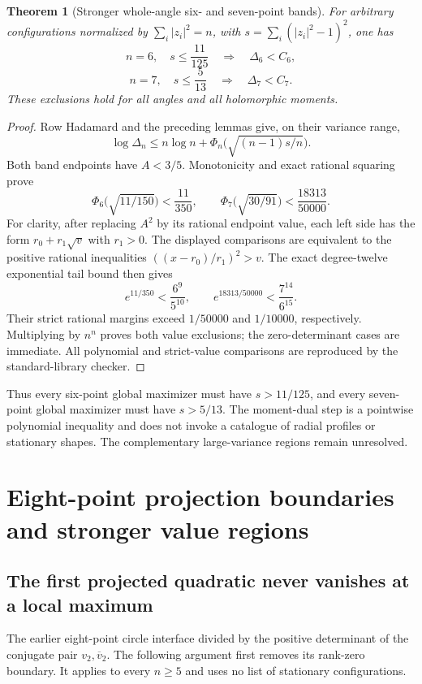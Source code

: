 \documentclass[11pt]{article}
\newtheorem{theorem}{Theorem}[section]
\theoremstyle{remark}
\numberwithin{equation}{section}
\begin{document}
\begin{theorem}[Stronger whole-angle six- and seven-point bands]
\label{thm:noorigin-oct8-quintic-bands}
For arbitrary configurations normalized by $\sum_i|z_i|^2=n$,
with $s=\sum_i(|z_i|^2-1)^2$, one has
\[
 n=6,\quad s\le\frac{11}{125}\quad\Longrightarrow\quad\Delta_6<C_6,
\]
\[
 n=7,\quad s\le\frac5{13}\quad\Longrightarrow\quad\Delta_7<C_7.
\]
These exclusions hold for all angles and all holomorphic moments.
\end{theorem}
\begin{proof}
Row Hadamard and the preceding lemmas give, on their variance range,
\[
       \log\Delta_n\le n\log n+\Phi_n\bigl(\sqrt{(n-1)s/n}\bigr).
\]
Both band endpoints have $A<3/5$. Monotonicity and exact rational
squaring prove
\[
 \Phi_6\bigl(\sqrt{11/150}\bigr)<\frac{11}{350},\qquad
 \Phi_7\bigl(\sqrt{30/91}\bigr)<\frac{18313}{50000}.
\]
For clarity, after replacing $A^2$ by its rational endpoint value,
each left side has the form $r_0+r_1\sqrt v$ with $r_1>0$.
The displayed comparisons are equivalent to the positive rational
inequalities $((x-r_0)/r_1)^2>v$.
The exact degree-twelve exponential tail bound then gives
\[
 e^{11/350}<\frac{6^9}{5^{10}},\qquad
 e^{18313/50000}<\frac{7^{14}}{6^{15}}.
\]
Their strict rational margins exceed $1/50000$ and $1/10000$,
respectively. Multiplying by $n^n$ proves both value exclusions;
the zero-determinant cases are immediate. All polynomial and
strict-value comparisons are reproduced by the standard-library
checker.
\end{proof}

Thus every six-point global maximizer must have $s>11/125$, and
every seven-point global maximizer must have $s>5/13$.
The moment-dual step is a pointwise polynomial inequality and does
not invoke a catalogue of radial profiles or stationary shapes.
The complementary large-variance regions remain unresolved.

\section{Eight-point projection boundaries and stronger value regions}
\subsection{The first projected quadratic never vanishes at a local maximum}
\label{sec:noorigin-oct8-eight-boundary}

The earlier eight-point circle interface divided by the positive
determinant of the conjugate pair $v_2,\overline v_2$. The following
argument first removes its rank-zero boundary. It applies to every
$n\ge5$ and uses no list of stationary configurations.
\end{document}
